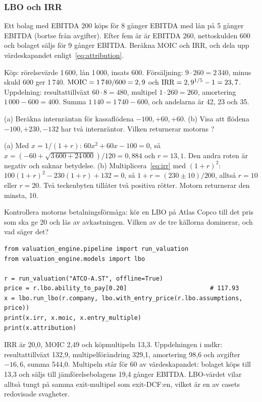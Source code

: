 \subsubsection*{LBO och IRR}

\begin{ovning}
Ett bolag med EBITDA 200 köps för 8 gånger EBITDA med lån på 5 gånger EBITDA (bortse från
avgifter). Efter fem år är EBITDA 260, nettoskulden 600 och bolaget säljs för 9 gånger EBITDA.
Beräkna MOIC och IRR, och dela upp värdeskapandet enligt~\eqref{eq:attribution}.
\end{ovning}
\begin{losning}
Köp: rörelsevärde 1\,600, lån 1\,000, insats 600. Försäljning: $9 \cdot 260 = 2\,340$, minus
skuld 600 ger 1\,740. $\mathrm{MOIC} = 1\,740 / 600 = 2,9$ och $\mathrm{IRR} = 2,9^{1/5} - 1 = 23,7$\pct.
Uppdelning: resultattillväxt $60 \cdot 8 = 480$, multipel $1 \cdot 260 = 260$, amortering
$1\,000 - 600 = 400$. Summa $1\,140 = 1\,740 - 600$, och andelarna är 42, 23 och 35\pct.
\end{losning}

\begin{ovning}
(a) Beräkna internräntan för kassaflödena $-100, +60, +60$. (b) Visa att flödena
$-100, +230, -132$ har två internräntor. Vilken returnerar motorns ?
\end{ovning}
\begin{losning}
(a) Med $x = 1/(1+r)$: $60x^2 + 60x - 100 = 0$, så
$x = (-60 + \sqrt{3\,600 + 24\,000})/120 = 0,884$ och $r = 13,1$\pct. Den andra roten är
negativ och saknar betydelse. (b) Multiplicera~\eqref{eq:irr} med $(1+r)^2$:
$100(1+r)^2 - 230(1+r) + 132 = 0$, så $1 + r = (230 \pm 10)/200$, alltså $r = 10$\pct{} eller
$r = 20$\pct. Två teckenbyten tillåter två positiva rötter. Motorn returnerar den minsta,
10\pct.
\end{losning}

\begin{ovning}
Kontrollera motorns betalningsförmåga: kör en LBO på Atlas Copco till det pris som ska ge
20\pct{} och läs av avkastningen. Vilken av de tre källorna dominerar, och vad säger det?
\begin{lstlisting}
from valuation_engine.pipeline import run_valuation
from valuation_engine.models import lbo

r = run_valuation("ATCO-A.ST", offline=True)
price = r.lbo.ability_to_pay[0.20]                       # 117.93
x = lbo.run_lbo(r.company, lbo.with_entry_price(r.lbo.assumptions, price))
print(x.irr, x.moic, x.entry_multiple)
print(x.attribution)
\end{lstlisting}
\end{ovning}
\begin{losning}
IRR är 20,0\pct, MOIC 2,49 och köpmultipeln 13,3. Uppdelningen i mdkr: resultattillväxt 132,9,
multipelförändring 329,1, amortering 98,6 och avgifter $-16,6$, summa 544,0. Multipeln står
för 60\pct{} av värdeskapandet: bolaget köps till 13,3 och säljs till jämförelsebolagens 19,4
gånger EBITDA. LBO-värdet vilar alltså tungt på samma exit-multipel som exit-DCF:en, vilket
är en av casets redovisade svagheter.
\end{losning}

